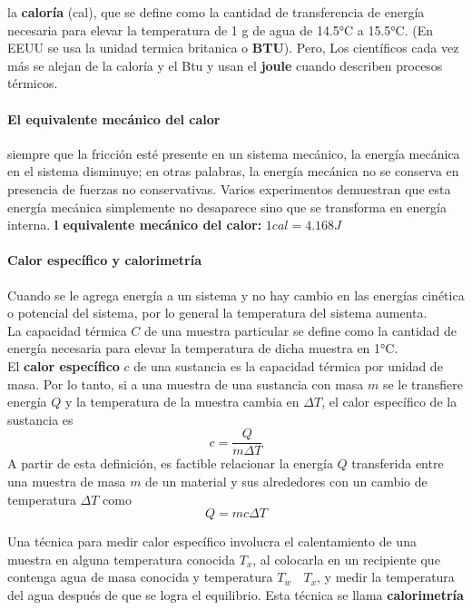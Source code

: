 \documentclass[10pt]{article}
\begin{document}
la \textbf{caloría} (cal), que se define como la cantidad de transferencia de energía necesaria para elevar la temperatura de 1 g de agua de 14.5°C a 15.5°C. (En EEUU se usa la unidad termica britanica o \textbf{BTU}). Pero, Los científicos cada vez más se alejan de la caloría y el Btu y usan el \textbf{joule} cuando describen procesos térmicos.

\paragraph{El equivalente mecánico del calor}

siempre que la fricción esté presente en un sistema mecánico, la energía mecánica en el sistema disminuye; en otras palabras, la energía mecánica no se conserva en presencia de fuerzas no conservativas. Varios experimentos demuestran que esta energía mecánica simplemente no desaparece sino que se transforma en energía interna. \textbf{l equivalente mecánico del calor:} $1 cal = 4.168 J$

\paragraph{Calor específico y calorimetría}

Cuando se le agrega energía a un sistema y no hay cambio en las energías cinética o potencial del sistema, por lo general la temperatura del sistema aumenta.\\
La capacidad térmica $C$ de una muestra particular se define como la cantidad de energía necesaria para elevar la temperatura de dicha muestra en 1°C.\\
El \textbf{calor específico} $c$ de una sustancia es la capacidad térmica por unidad de masa. Por lo tanto, si a una muestra de una sustancia con masa $m$ se le transfiere energía $Q$ y la temperatura de la muestra cambia en $\Delta T$, el calor específico de la sustancia es
\begin{equation*}
	c = \dfrac{Q}{m \Delta T}
\end{equation*}
A partir de esta definición, es factible relacionar la energía $Q$ transferida entre una muestra de masa $m$ de un material y sus alrededores con un cambio de temperatura $\Delta T$ como
\begin{equation*}
	Q = mc \Delta T
\end{equation*}

Una técnica para medir calor específico involucra el calentamiento de una muestra en alguna temperatura conocida $T_x$, al colocarla en un recipiente que contenga agua de masa conocida y temperatura $T_w$  $T_x$, y medir la temperatura del agua después de que se logra el equilibrio. Esta técnica se llama \textbf{calorimetría}
\end{document}
